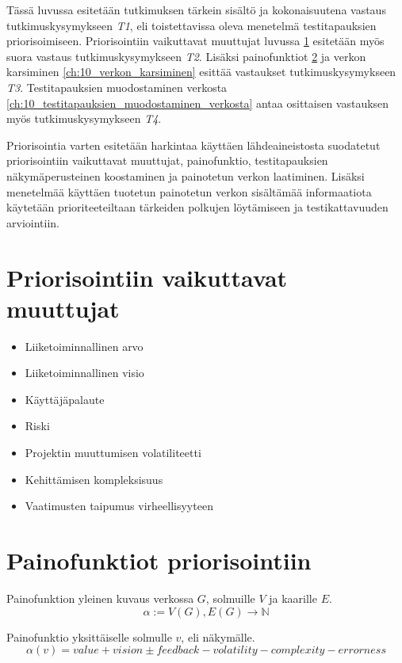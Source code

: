 Tässä luvussa esitetään tutkimuksen tärkein sisältö ja kokonaisuutena vastaus tutkimuskysymykseen \emph{T1}, eli toistettavissa oleva menetelmä testitapauksien priorisoimiseen.
Priorisointiin vaikuttavat muuttujat luvussa \ref{ch:10_priorisointiin_vaikuttavat_muuttujat} esitetään myös suora vastaus tutkimuskysymykseen \emph{T2}.
Lisäksi painofunktiot \ref{ch:10_painofunktiot_priorisointiin} ja verkon karsiminen \ref{ch:10_verkon_karsiminen} esittää vastaukset tutkimuskysymykseen \emph{T3}.
Testitapauksien muodostaminen verkosta \ref{ch:10_testitapauksien_muodostaminen_verkosta} antaa osittaisen vastauksen myös tutkimuskysymykseen \emph{T4}.

Priorisointia varten esitetään harkintaa käyttäen lähdeaineistosta suodatetut priorisointiin vaikuttavat muuttujat, painofunktio, testitapauksien näkymäperusteinen koostaminen ja painotetun verkon laatiminen.
Lisäksi menetelmää käyttäen tuotetun painotetun verkon sisältämää informaatiota käytetään prioriteeteiltaan tärkeiden polkujen löytämiseen ja testikattavuuden arviointiin.

\section{Priorisointiin vaikuttavat muuttujat} \label{ch:10_priorisointiin_vaikuttavat_muuttujat}

  \begin{itemize}
    \item Liiketoiminnallinen arvo
    \item Liiketoiminnallinen visio
    \item Käyttäjäpalaute
    \item Riski
    \item Projektin muuttumisen volatiliteetti
    \item Kehittämisen kompleksisuus
    \item Vaatimusten taipumus virheellisyyteen
  \end{itemize}

\section{Painofunktiot priorisointiin} \label{ch:10_painofunktiot_priorisointiin}

  Painofunktion yleinen kuvaus verkossa \(G\), solmuille \(V\) ja kaarille \(E\).
  \[\alpha := V(G), E(G) \rightarrow \mathbb{N}\]

  Painofunktio yksittäiselle solmulle \(v\), eli näkymälle.
  \[\alpha(v) = value + vision \pm feedback - volatility - complexity - errorness\]

